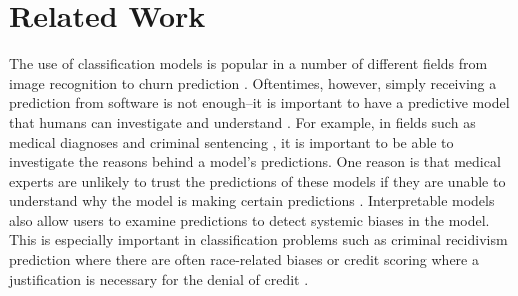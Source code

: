 
\chapter{Related Work}

The use of classification models is popular in a number of different fields from image recognition \cite{LeCunBoBeHa98} to churn prediction \cite{LemmensCr06}.
Oftentimes, however, simply receiving a prediction from software is not enough--it is important to have a predictive model that humans can investigate and understand \cite{Bratko97, Quinlan99, Ruping06, MartensVaVeBa11, Freitas14}.
For example, in fields such as medical diagnoses \cite{BellazziZu08} and criminal sentencing \cite{LarsonMaKiAn16}, it is important to be able to investigate the reasons behind a model's predictions.
One reason is that medical experts are unlikely to trust the predictions of these models if they are unable to understand why the model is making certain predictions \cite{Lavrač99}.
Interpretable models also allow users to examine predictions to detect systemic biases in the model.
This is especially important in classification problems such as criminal recidivism prediction where there are often race-related biases \cite{LarsonMaKiAn16} or credit scoring where a justification is necessary for the denial of credit \cite{BaesensMuDeVaSe05}.

